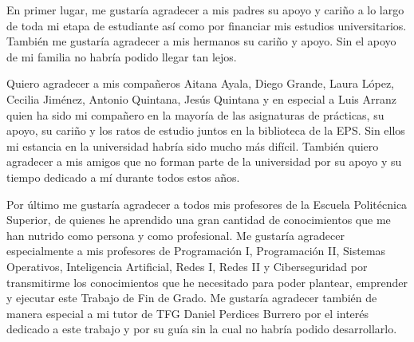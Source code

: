 En primer lugar, me gustaría agradecer a mis padres su apoyo y cariño a lo largo de toda mi etapa de estudiante así como por financiar mis estudios universitarios. También me gustaría agradecer a mis hermanos su cariño y apoyo. Sin el apoyo de mi familia no habría podido llegar tan lejos.

Quiero agradecer a mis compañeros Aitana Ayala, Diego Grande, Laura López, Cecilia Jiménez, Antonio Quintana, Jesús Quintana y en especial a Luis Arranz quien ha sido mi compañero en la mayoría de las asignaturas de prácticas, su apoyo, su cariño y los ratos de estudio juntos en la biblioteca de la EPS. Sin ellos mi estancia en la universidad habría sido mucho más difícil. También quiero agradecer a mis amigos que no forman parte de la universidad por su apoyo y su tiempo dedicado a mí durante todos estos años.

Por último me gustaría agradecer a todos mis profesores de la Escuela Politécnica Superior, de quienes he aprendido una gran cantidad de conocimientos que me han nutrido como persona y como profesional. Me gustaría agradecer especialmente a mis profesores de Programación I, Programación II, Sistemas Operativos, Inteligencia Artificial, Redes I, Redes II y Ciberseguridad por transmitirme los conocimientos que he necesitado para poder plantear, emprender y ejecutar este Trabajo de Fin de Grado. Me gustaría agradecer también de manera especial a mi tutor de TFG Daniel Perdices Burrero por el interés dedicado a este trabajo y por su guía sin la cual no habría podido desarrollarlo.
